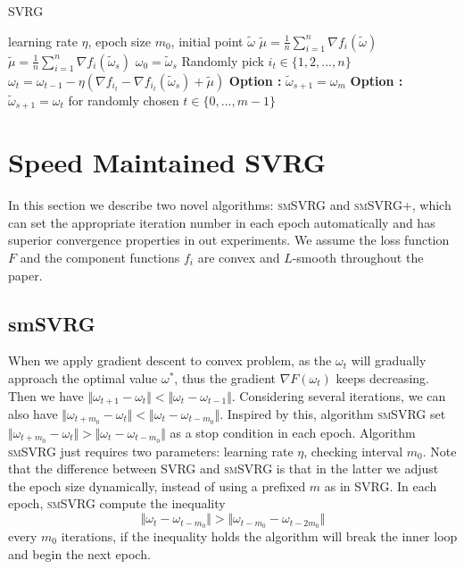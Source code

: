 \documentclass[conference]{IEEEtran}
\begin{document}
 \begin{algorithm}[t]
 	\caption{\textsc{SVRG}}
	\label{SVRG}
	\begin{algorithmic}[1]
	\Require learning rate $\eta$,  epoch size $m_0$, initial point $\tilde{\omega}$
	\State $\tilde{\mu} = \frac{1}{n}\sum\limits_{i=1}^{n}\nabla f_{i}(\tilde{\omega})$
		\State $\tilde{\mu} = \frac{1}{n}\sum\limits_{i=1}^{n}\nabla f_{i}(\tilde{\omega}_{s})$
		\State $\omega_0 = \tilde{\omega}_s$
			\State Randomly pick $i_t\in\{1, 2, ..., n\}$
			\State $\omega_t = \omega_{t-1} - \eta(\nabla f_{i_t} - \nabla f_{i_t}(\tilde{\omega}_s)+\tilde{\mu})$
		\EndFor
		\State \textbf{Option \uppercase\expandafter{}:} $\tilde{\omega}_{s+1} = \omega_{m}$
		\State \textbf{Option \uppercase\expandafter{}:} $\tilde{\omega}_{s+1} = \omega_{t}$ for randomly chosen $t \in \{0, ... ,m - 1\}$ 
	\EndFor
	\end{algorithmic}
\end{algorithm}




 \section{Speed Maintained SVRG}
 \label{mywork}
 In this section we describe two novel algorithms: \textsc{smSVRG} and \textsc{smSVRG+}, which can set the appropriate iteration number in each epoch automatically and has superior convergence properties in out experiments.
 We assume the loss function $F$ and the component functions $f_i$ are convex and $L$-smooth throughout the paper.
 
 \subsection{smSVRG}
 When we apply gradient descent to convex problem, as the $\omega_t$ will gradually approach the optimal value $\omega^*$, thus the gradient $\nabla F(\omega_t)$ keeps decreasing. Then we have $\Vert\omega_{t+1}-\omega_t\Vert<\Vert\omega_{t}-\omega_{t-1}\Vert$. Considering several iterations, we can also have $\Vert\omega_{t+m_0}-\omega_t\Vert<\Vert\omega_{t}-\omega_{t-m_0}\Vert$. Inspired by this, algorithm \textsc{smSVRG}  set $\Vert\omega_{t+m_0}-\omega_t\Vert>\Vert\omega_{t}-\omega_{t-m_0}\Vert$ as a stop condition in each epoch. 
 Algorithm \textsc{smSVRG} just requires two parameters: learning rate $\eta$, checking interval $m_0$. Note that the difference between SVRG and \textsc{smSVRG} is that in the latter we adjust the epoch size dynamically, instead of using a prefixed $m$ as in SVRG. In each epoch, \textsc{smSVRG} compute the inequality $$\Vert\omega_{t}-\omega_{t-m_0}\Vert>\Vert\omega_{t-m_0}-\omega_{t-2m_0}\Vert$$ every $m_0$ iterations, if the inequality holds the algorithm will break the inner loop and begin the next epoch.
 
\end{document}
